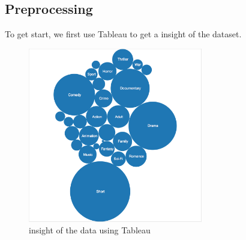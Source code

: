 \documentclass{vldb}
\begin{document}
\subsection{Preprocessing}
\par To get start, we first use Tableau to get a insight of the dataset. 
\begin{figure}
\begin{center}
\includegraphics[width=3.00in]{tableau.png}
\caption{insight of the data using Tableau}
\end{center}
\end{figure}
\end{document}
